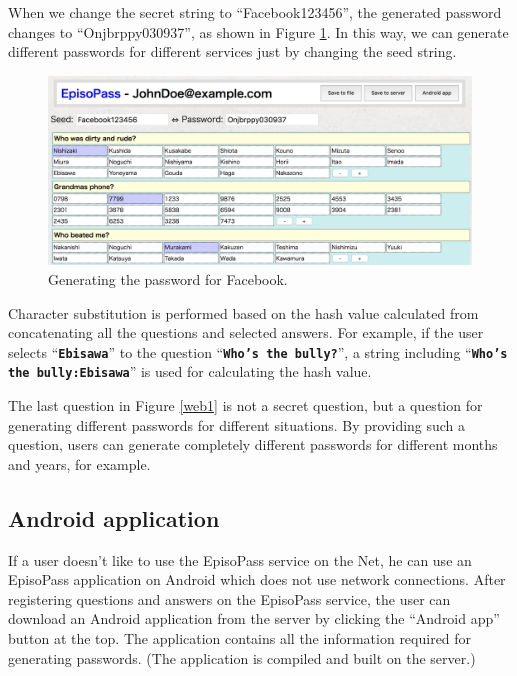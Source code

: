 \documentclass[runningheads,a4paper]{llncs}
\begin{document}
When we change the secret string to ``\textsf{Facebook123456}'',
the generated password changes to ``\textsf{Onjbrppy030937}'',
as shown in Figure \ref{web2}.
In this way, we can generate different passwords for
different services just by changing the seed string.

\begin{figure}[H]
  \centering
  \includegraphics[width=1.0\columnwidth]{figures/ab4517dd593c1cabab5fecef546f7e88}
  \caption{Generating the password for Facebook.}
  \label{web2}
\end{figure}

Character substitution is performed based on the hash value
calculated from concatenating all the questions and selected answers.
%
For example, if the user selects ``\textbf{\texttt{Ebisawa}}''
to the question ``\textbf{\texttt{Who's the bully?}}'',
a string including ``\textbf{\texttt{Who's the bully:Ebisawa}}''
is used for calculating the hash value.

The last question in Figure \ref{web1} is not a secret question, but a question
for generating different passwords for different situations.
By providing such a question, users can generate completely different passwords
for different months and years, for example.

\subsection{Android application}

If a user doesn't like to use the EpisoPass service on the Net,
he can use an EpisoPass application on Android
which does not use network connections.
After registering questions and answers on the EpisoPass service,
the user can download an Android application from the server
by clicking the ``Android app'' button at the top.
The application contains all the information required for generating passwords.
(The application is compiled and built on the server.)
\end{document}
